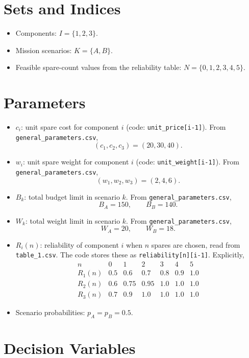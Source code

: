 \section*{Sets and Indices}

\begin{itemize}
    \item Components: $I=\{1,2,3\}$.
    \item Mission scenarios: $K=\{A,B\}$.
    \item Feasible spare-count values from the reliability table: $N=\{0,1,2,3,4,5\}$.
\end{itemize}

\section*{Parameters}

\begin{itemize}
    \item $c_i$: unit spare cost for component $i$ (code: \texttt{unit\_price[i-1]}). From \texttt{general\_parameters.csv},
    \[
    (c_1,c_2,c_3)=(20,30,40).
    \]
    \item $w_i$: unit spare weight for component $i$ (code: \texttt{unit\_weight[i-1]}). From \texttt{general\_parameters.csv},
    \[
    (w_1,w_2,w_3)=(2,4,6).
    \]
    \item $B_k$: total budget limit in scenario $k$. From \texttt{general\_parameters.csv},
    \[
    B_A=150,\qquad B_B=140.
    \]
    \item $W_k$: total weight limit in scenario $k$. From \texttt{general\_parameters.csv},
    \[
    W_A=20,\qquad W_B=18.
    \]
    \item $R_i(n)$: reliability of component $i$ when $n$ spares are chosen, read from \texttt{table\_1.csv}. The code stores these as \texttt{reliability[n][i-1]}. Explicitly,
    \[
    \begin{array}{c|cccccc}
    n & 0 & 1 & 2 & 3 & 4 & 5\\ \hline
    R_1(n) & 0.5 & 0.6 & 0.7 & 0.8 & 0.9 & 1.0\\
    R_2(n) & 0.6 & 0.75 & 0.95 & 1.0 & 1.0 & 1.0\\
    R_3(n) & 0.7 & 0.9 & 1.0 & 1.0 & 1.0 & 1.0
    \end{array}
    \]
    \item Scenario probabilities: $p_A=p_B=0.5$.
\end{itemize}

\section*{Decision Variables}

